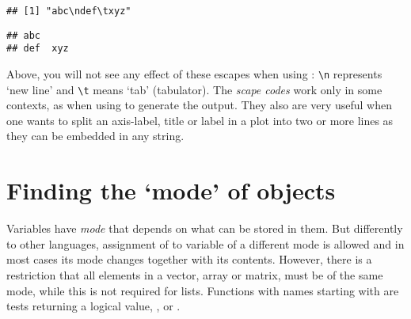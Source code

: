 \documentclass[paper=a4,10pt,div=17,headsepline,BCOR=12mm,twoside,open=right]{scrbook}\usepackage{knitr}
\begin{document}
\begin{knitrout}\footnotesize
{}\color{fgcolor}\begin{kframe}
\begin{alltt}
 \hlkwb{<-} 
\end{alltt}
\begin{verbatim}
## [1] "abc\ndef\txyz"
\end{verbatim}
\begin{alltt}
\end{alltt}
\begin{verbatim}
## abc
## def	xyz
\end{verbatim}
\end{kframe}
\end{knitrout}

Above, you will not see any effect of these escapes when using : \verb|\n| represents `new line' and \verb|\t| means `tab' (tabulator). The \textit{scape codes} work only in some contexts, as when using  to generate the output. They also are very useful when one wants to split an axis-label, title or label in a plot into two or more lines as they can be embedded in any string.

\section{Finding the `mode' of objects}

Variables have \emph{mode} that depends on what can be stored in them. But differently to other languages, assignment of to variable of a different mode is allowed and in most cases its mode changes together with its contents. However, there is a restriction that all elements in a vector, array or matrix, must be of the same mode, while this is not required for lists. Functions with names starting with  are tests returning a logical value, ,  or .
\end{document}
